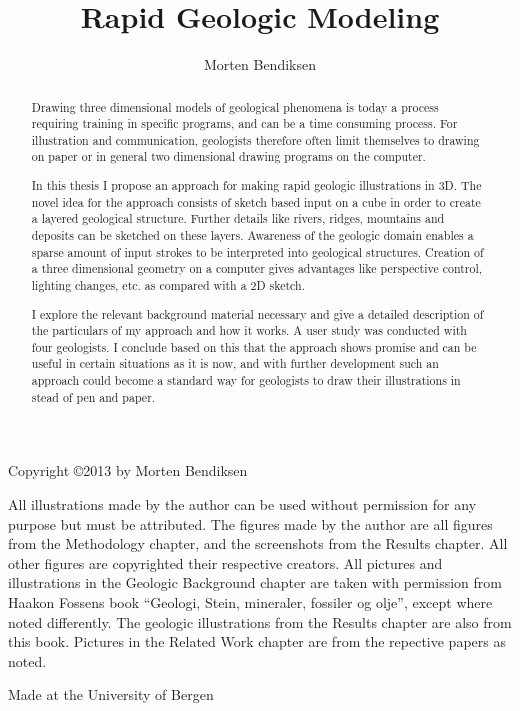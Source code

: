 \documentclass[a4paper,12pt]{report}
\title{Rapid Geologic Modeling}
\author{Morten Bendiksen}
\begin{document}
\maketitle


\clearpage
\begin{abstract}
Drawing three dimensional models of geological phenomena is today a process requiring training in specific programs, and can be a time consuming process. For illustration and communication, geologists therefore often limit themselves to drawing on paper or in general two dimensional drawing programs on the computer.

In this thesis I propose an approach for making rapid geologic illustrations in 3D. The novel idea for the approach consists of sketch based input on a cube in order to create a layered geological structure. Further details like rivers, ridges, mountains and deposits can be sketched on these layers. Awareness of the geologic domain enables a sparse amount of input strokes to be interpreted into geological structures. Creation of a three dimensional geometry on a computer gives advantages like perspective control, lighting changes, etc. as compared with a 2D sketch.

I explore the relevant background material necessary and give a detailed description of the particulars of my approach and how it works. A user study was conducted with four geologists. I conclude based on this that the approach shows promise and can be useful in certain situations as it is now, and with further development such an approach could become a standard way for geologists to draw their illustrations in stead of pen and paper.
\end{abstract}

\clearpage
\null\vfill 
\pagestyle{empty}
\begin{minipage}[b]{0.9\textwidth}
\footnotesize\raggedright
\setlength{\parskip}{0.5\baselineskip}
Copyright \copyright 2013 by Morten Bendiksen\par

All illustrations made by the author can be used without permission for any purpose but must be attributed. The figures made by the author are all figures from the Methodology chapter, and the screenshots from the Results chapter. All other figures are copyrighted their respective creators. All pictures and illustrations in the Geologic Background chapter are taken with permission from Haakon Fossens book ``Geologi, Stein, mineraler, fossiler og olje'', except where noted differently. The geologic illustrations from the Results chapter are also from this book. Pictures in the Related Work chapter are from the repective papers as noted. 

Made at the University of Bergen

\end{minipage}
\end{document}
